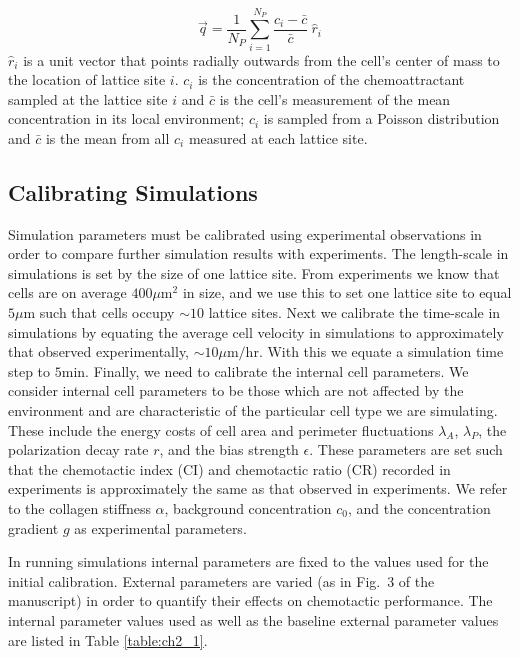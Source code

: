 \begin{equation} \label{eq:CPMq1}
    \vec{q} = \frac{1}{N_P} \sum_{i=1}^{N_P} \frac{c_i-\bar{c}}{\bar{c}} \ \hat{r}_i
\end{equation}
$\hat{r}_i$ is a unit vector that points radially outwards from the cell's center of mass to the location of lattice site $i$. $c_i$ is the concentration of the chemoattractant sampled at the lattice site $i$ and $\bar{c}$ is the cell's measurement of the mean concentration in its local environment; $c_i$ is sampled from a Poisson distribution and $\bar{c}$ is the mean from all $c_i$ measured at each lattice site.

\subsection{Calibrating Simulations}

Simulation parameters must be calibrated using experimental observations in order to compare further simulation results with experiments. The length-scale in simulations is set by the size of one lattice site. From experiments we know that cells are on average $400 \mu\text{m}^2$ in size, and we use this to set one lattice site to equal $5 \mu\text{m}$ such that cells occupy $\sim 10$ lattice sites. Next we calibrate the time-scale in simulations by equating the average cell velocity in simulations to approximately that observed experimentally, $\sim 10 \mu\text{m/hr}$. With this we equate a simulation time step to $5 \text{min}$. Finally, we need to calibrate the internal cell parameters. We consider internal cell parameters to be those which are not affected by the environment and are characteristic of the particular cell type we are simulating.
These include the energy costs of cell area and perimeter fluctuations $\lambda_A$, $\lambda_P$, the polarization decay rate $r$, and the bias strength $\epsilon$. These parameters are set such that the chemotactic index (CI) and chemotactic ratio (CR) recorded in experiments is approximately the same as that observed in experiments. We refer to the collagen stiffness $\alpha$, background concentration $c_0$, and the concentration gradient $g$ as experimental parameters.

In running simulations internal parameters are fixed to the values used for the initial calibration. External parameters are varied (as in Fig.\ 3 of the manuscript) in order to quantify their effects on chemotactic performance. The internal parameter values used as well as the baseline external parameter values are listed in Table \ref{table:ch2_1}.

